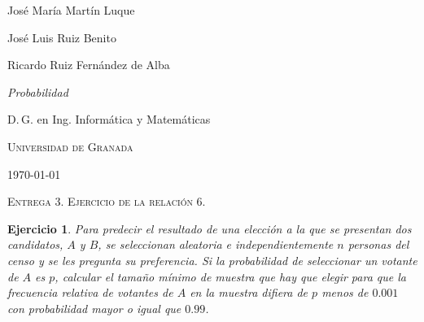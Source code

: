 \documentclass[
  a4paper,
  spanish,
  12pt,
]{scrartcl}
\theoremstyle{ejercicio-style}
\newtheorem{ejer}{Ejercicio}
\theoremstyle{remark-style}
\begin{document}
\begin{flushright}
  José María Martín Luque
  
  José Luis Ruiz Benito

  Ricardo Ruiz Fernández de Alba\vspace{.5em}

  \textit{Probabilidad}

  D.\,G. en Ing. Informática y Matemáticas

  \textsc{Universidad de Granada}\vspace{.5em}

  \today\vspace{.5em}
\end{flushright}

\begin{flushleft}
  \scshape\Large Entrega 3. Ejercicio de la relación 6.
\end{flushleft}

\setcounter{ejer}{4}

\begin{ejer}
  Para predecir el resultado de una elección a la que se presentan dos candidatos, \(A\) y \(B\), se seleccionan aleatoria e independientemente \(n\) personas del censo y se les pregunta su preferencia.
  Si la probabilidad de seleccionar un votante de \(A\) es \(p\), calcular el tamaño mínimo de muestra que hay que elegir para que la frecuencia relativa de votantes de \(A\) en la muestra difiera de \(p\) menos de \(0.001\) con probabilidad mayor o igual que \(0.99\).
\end{ejer}
\end{document}
